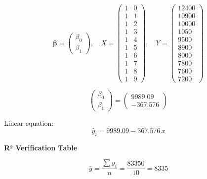 \documentclass[12pt,a4paper]{article}
\begin{document}
\[
\bm{\beta} = \begin{pmatrix}\beta_0\\\beta_1\end{pmatrix},\quad
X = \begin{pmatrix}1&0\\1&1\\1&2\\1&3\\1&4\\1&5\\1&6\\1&7\\1&8\\1&9\end{pmatrix},\quad
Y = \begin{pmatrix}12400\\10900\\10000\\1050\\9500\\8900\\8000\\7800\\7600\\7200\end{pmatrix}
\]

\[
\begin{pmatrix}\beta_0\\\beta_1\end{pmatrix} = \begin{pmatrix}9989.09\\-367.576\end{pmatrix}
\]

Linear equation:
\begin{equation}
  \hat{y}_i = 9989.09 - 367.576\,x
\end{equation}

\textbf{R² Verification Table}

\[
\bar{y} = \frac{\sum y_i}{n} = \frac{83350}{10} = 8335
\]
\end{document}
